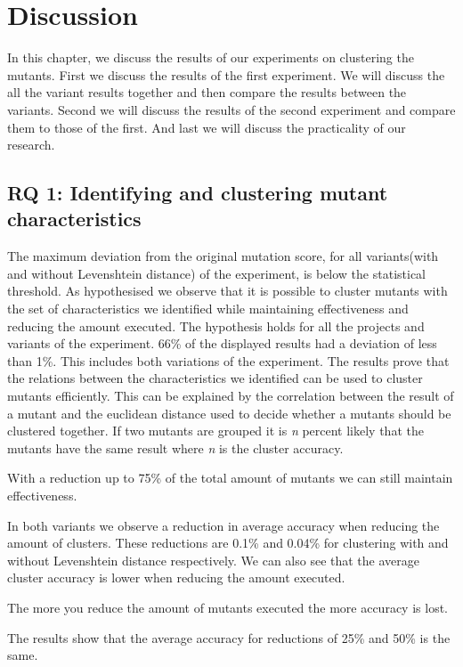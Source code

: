 \documentclass[../main]{subfiles}
\begin{document}
\chapter{Discussion}
\label{ch:discussion}
In this chapter, we discuss the results of our experiments on clustering the mutants.
First we discuss the results of the first experiment. 
We will discuss the all the variant results together and then compare the results between the variants.
Second we will discuss the results of the second experiment and compare them to those of the first.
And last we will discuss the practicality of our research.

\section{RQ 1: Identifying and clustering mutant characteristics}
The maximum deviation from the original mutation score, for all variants(with and without Levenshtein distance) of the experiment, is below the statistical threshold.
As hypothesised we observe that it is possible to cluster mutants with the set of characteristics we identified while maintaining effectiveness and reducing the amount executed.
The hypothesis holds for all the projects and variants of the experiment.
66\% of the displayed results had a deviation of less than 1\%. 
This includes both variations of the experiment.
\newline
The results prove that the relations between the characteristics we identified can be used to cluster mutants efficiently. 
This can be explained by the correlation between the result of a mutant and the euclidean distance used to decide whether a mutants should be clustered together.
If two mutants are grouped it is \textit{n} percent likely that the mutants have the same result where \textit{n} is the cluster accuracy.
\begin{finding}
    With a reduction up to 75\% of the total amount of mutants we can still maintain effectiveness.
\end{finding}
In both variants we observe a reduction in average accuracy when reducing the amount of clusters.
These reductions are 0.1\% and 0.04\% for clustering with and without Levenshtein distance respectively.
We can also see that the average cluster accuracy is lower when reducing the amount executed.
\begin{finding}
    The more you reduce the amount of mutants executed the more accuracy is lost.
\end{finding}
The results show that the average accuracy for reductions of 25\% and 50\% is the same.
\end{document}

